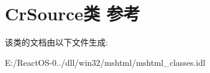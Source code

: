 \hypertarget{class_cr_source}{}\section{Cr\+Source类 参考}
\label{class_cr_source}


该类的文档由以下文件生成\+:\begin{DoxyCompactItemize}
\item 
E\+:/\+React\+O\+S-\/0../dll/win32/mshtml/mshtml\+\_\+classes.\+idl\end{DoxyCompactItemize}
